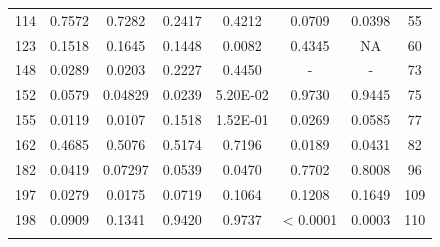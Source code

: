 \begin{table}[H]
{\begin{tabular}{cccccccc}
114 & 0.7572 & 0.7282 & 0.2417 & 0.4212 & 0.0709 & {\color{red}0.0398} & 55 \\ 
123 & 0.1518 & 0.1645 & 0.1448 & {\color{red}0.0082} & 0.4345 & NA & 60 \\ 
148 & {\color{red}0.0289} & {\color{red}0.0203} & 0.2227 & 0.4450 & - & - &  73 \\ 
152 & 0.0579 & {\color{red}0.04829} & {\color{red}0.0239} & 5.20E-02 & 0.9730 & 0.9445 & 75 \\ 
155 & {\color{red}0.0119} & {\color{red}0.0107} & 0.1518 & 1.52E-01 & {\color{red}0.0269} & 0.0585 & 77 \\ 
162 & 0.4685 & 0.5076 & 0.5174 & 0.7196 & {\color{red}0.0189} & {\color{red}0.0431} & 82 \\ 
182 & {\color{red}0.0419} & 0.07297 & 0.0539 & {\color{red}0.0470} & 0.7702 & 0.8008 & 96 \\ 
197 & {\color{red}0.0279} & {\color{red}0.0175} & 0.0719 & 0.1064 & 0.1208 & 0.1649 & 109 \\
198 & 0.0909 & 0.1341 & 0.9420 & 0.9737 & {\color{red} < 0.0001} & {\color{red}0.0003} & 110 \\ \hline		
\label{tab:sorinorotation1}
\end{tabular}
}
\end{table}


 \begin{table}[H]
\caption{Teste Cramer e Hotelling aplicado na amostra II do catálogo III com rotação utilizando mediana.}
\vspace{12pt}
\centering{}
\end{table}

